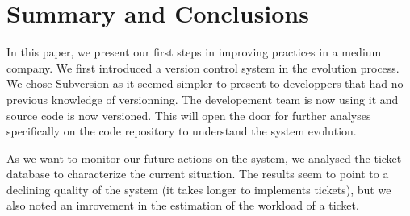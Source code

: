 \documentclass[10pt,conference]{IEEEtran}
\begin{document}


\section{Summary and Conclusions}
\label{sec:conclusion}

In this paper, we present our first steps in improving practices in a medium company. We first introduced  a version control system in the evolution process.
We chose Subversion as it seemed simpler to present to developpers that had no previous knowledge of versionning.
The developement team is now using it and source code is now versioned.
This will open the door for further analyses specifically on the code repository to understand the system evolution. 

As we want to monitor our future actions on the system, we analysed the ticket database to  characterize the current situation.
The results seem to point to a declining quality of the system (it takes longer to implements tickets), but we also noted an imrovement in the estimation of the workload of a ticket.


%


\vspace{12pt}
\end{document}
